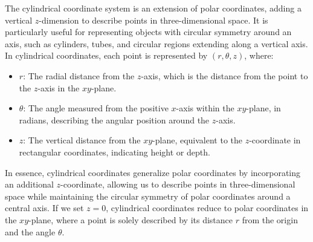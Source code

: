 The cylindrical coordinate system is an extension of polar coordinates, adding a vertical \( z \)-dimension to describe points in three-dimensional space. It is particularly useful for representing objects with circular symmetry around an axis, such as cylinders, tubes, and circular regions extending along a vertical axis. In cylindrical coordinates, each point is represented by \( (r, \theta, z) \), where:
\begin{itemize}
    \item \( r \): The radial distance from the \( z \)-axis, which is the distance from the point to the \( z \)-axis in the \( xy \)-plane.
    \item \( \theta \): The angle measured from the positive \( x \)-axis within the \( xy \)-plane, in radians, describing the angular position around the \( z \)-axis.
    \item \( z \): The vertical distance from the \( xy \)-plane, equivalent to the \( z \)-coordinate in rectangular coordinates, indicating height or depth.
\end{itemize}

\noindent In essence, cylindrical coordinates generalize polar coordinates by incorporating an additional \( z \)-coordinate, allowing us to describe points in three-dimensional space while maintaining the circular symmetry of polar coordinates around a central axis. If we set \( z = 0 \), cylindrical coordinates reduce to polar coordinates in the \( xy \)-plane, where a point is solely described by its distance \( r \) from the origin and the angle \( \theta \). 

